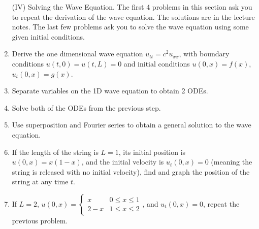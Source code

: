 \begin{enumerate}
\item[(IV)] Solving the Wave Equation. The first 4 problems in this section ask you to repeat the derivation of the wave equation.  The solutions are in the lecture notes.  The last few problems ask you to solve the wave equation using some given initial conditions.

  \item Derive the one dimensional wave equation $u_{tt} = c^2 u_{xx}$, with boundary conditions $u(t,0)=u(t,L) = 0$ and initial conditions $u(0,x) = f(x)$, $u_t(0,x)=g(x)$.
  \item Separate variables on the 1D wave equation to obtain 2 ODEs.
  \item Solve both of the ODEs from the previous step.
  \item Use superposition and Fourier series to obtain a general solution to the wave equation.
 
 	\item If the length of the string is $L=1$, its initial position is $u(0,x) = x(1-x)$, and the initial velocity is $u_t(0,x)=0$ (meaning the string is released with no initial velocity), find and graph the position of the string at any time $t$.
 	\item If $L=2$, $u(0,x) = \begin{cases}x & 0\leq x\leq 1\\2-x & 1\leq x\leq 2\end{cases}$, and $u_t(0,x)=0$, repeat the previous problem.
 	
\end{enumerate}



